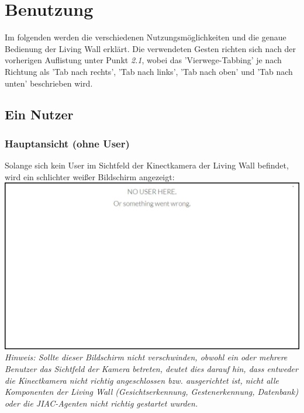 \documentclass[10pt,a4paper]{report}
\begin{document}
	\section{Benutzung}
	Im folgenden werden die verschiedenen Nutzungsmöglichkeiten und die genaue Bedienung der Living Wall erklärt. Die verwendeten Gesten richten sich nach der vorherigen Auflistung unter Punkt \textit{2.1}, wobei das 'Vierwege-Tabbing' je nach Richtung als 'Tab nach rechts', 'Tab nach links', 'Tab nach oben' und 'Tab nach unten' beschrieben wird.
		\subsection{Ein Nutzer}
		\subsubsection{Hauptansicht (ohne User)}
		Solange sich kein User im Sichtfeld der Kinectkamera der Living Wall befindet, wird ein schlichter weißer Bildschirm angezeigt: \\
		\includegraphics[scale=0.31]{NoUser} \\
		\textit{Hinweis: Sollte dieser Bildschirm nicht verschwinden, obwohl ein oder mehrere Benutzer das Sichtfeld der Kamera betreten, deutet dies darauf hin, dass entweder die Kinectkamera nicht richtig angeschlossen bzw. ausgerichtet ist, nicht alle Komponenten der Living Wall (Gesichtserkennung, Gestenerkennung, Datenbank) oder die JIAC-Agenten nicht richtig gestartet wurden.}
\end{document}
